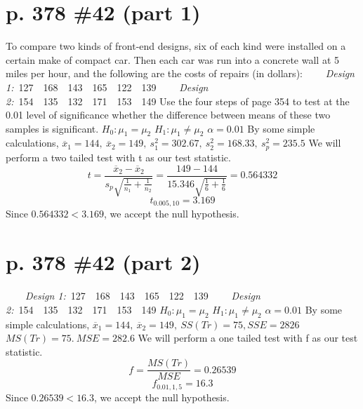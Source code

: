 \documentclass[12pt]{article}
\begin{document}
  \section[20pt]{p. 378 \#42 (part 1)}
To compare two kinds of front-end designs, six of each kind were installed on a certain make of compact car. Then each car was run into a concrete wall at 5 miles per hour, and the following are the costs of repairs (in dollars):
\newline \newline
\ \ \ \ \textit{Design 1:}\ 127\ \ 168\ \ 143\ \ 165\ \ 122\ \ 139
\newline
\ \ \ \ \textit{Design 2:}\ 154\ \ 135\ \ 132\ \ 171\ \ 153\ \ 149
\newline \newline
Use the four steps of page 354 to test at the 0.01 level of significance whether the difference between means of these two samples is significant.
\newline \newline
\(H_0: \mu_1 = \mu_2\)
\newline
\(H_1: \mu_1 \neq \mu_2\)
\newline
\(\alpha = 0.01\)
\newline
\newline
By some simple calculations,
\(\overline{x}_1 = 144,\ \overline{x}_2 = 149,\ s_1^2 = 302.67,\ s_2^2 = 168.33,\ s_p^2 = 235.5\)
\newline
We will perform a two tailed test with t as our test statistic.
\[t = \frac{\overline{x}_2 - \overline{x}_2}{s_p\sqrt{\frac{1}{n_1}+\frac{1}{n_2}}} = \frac{149 - 144}{15.346\sqrt{\frac{1}{6}+\frac{1}{6}}} = 0.564332\]
\[t_{0.005,10}=3.169\]
Since \(0.564332 < 3.169\), we accept the null hypothesis.
\newpage
  \section[20pt]{p. 378 \#42 (part 2)}
\ \ \ \ \textit{Design 1:}\ 127\ \ 168\ \ 143\ \ 165\ \ 122\ \ 139
\newline
\ \ \ \ \textit{Design 2:}\ 154\ \ 135\ \ 132\ \ 171\ \ 153\ \ 149
\newline \newline
\(H_0: \mu_1 = \mu_2\)
\newline
\(H_1: \mu_1 \neq \mu_2\)
\newline
\(\alpha = 0.01\)
\newline
\newline
By some simple calculations,
\(\overline{x}_1 = 144,\ \overline{x}_2 = 149,\ SS(Tr) = 75, SSE = 2826\)
\newline
\(MS(Tr) = 75.\ MSE = 282.6\)
\newline
We will perform a one tailed test with f as our test statistic.
\[f = \frac{MS(Tr)}{MSE} = 0.26539\]
\[f_{0.01,1,5}=16.3\]
Since \(0.26539 < 16.3\), we accept the null hypothesis.
\newpage
\end{document}
